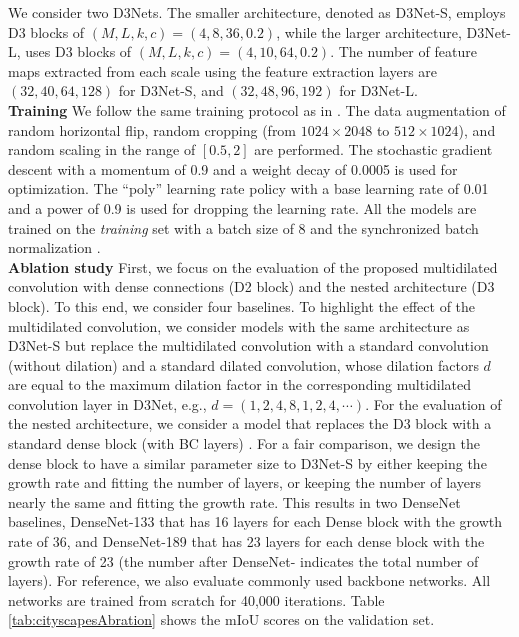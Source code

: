 \documentclass[final]{cvpr}
\begin{document}
We consider two D3Nets. The smaller architecture, denoted as D3Net-S, employs D3 blocks of $(M,L,k,c) = (4,8,36,0.2)$, while the larger architecture, D3Net-L, uses D3 blocks of $(M,L,k,c) = (4,10,64,0.2)$. The number of feature maps extracted from each scale using the feature extraction layers are $(32,40,64,128)$ for D3Net-S, and $(32,48,96,192)$ for D3Net-L. 
\vspace{3mm}\\
\textbf{Training} \hspace{1mm}
We follow the same training protocol as in \cite{zhao2017pspnet,zhao2018psanet}. The data augmentation of random horizontal flip, random cropping (from $1024\times2048$ to $512\times1024$), and random scaling in the range of $[0.5, 2]$ are performed.
The stochastic gradient descent with a momentum of 0.9 and a
weight decay of 0.0005 is used for optimization. 
The ``poly'' learning rate policy with a base learning rate of 0.01 and a power of 0.9 is used for dropping the learning rate. All the models are trained on the \textit{training} set with a batch size of 8 and the synchronized batch normalization \cite{Zhang18SyncBN}.
\vspace{3mm}\\
\textbf{Ablation study} \hspace{1mm}
First, we focus on the evaluation of the proposed multidilated convolution with dense connections (D2 block) and the nested architecture (D3 block). To this end, we consider four baselines. To highlight the effect of the multidilated convolution, we consider models with the same architecture as D3Net-S but replace the multidilated convolution with a standard convolution (without dilation) and a standard dilated convolution, whose dilation factors $d$ are equal to the maximum dilation factor in the corresponding multidilated convolution layer in D3Net, e.g., $d=(1,2,4,8,1,2,4,\cdots)$. For the evaluation of the nested architecture, we consider a model that replaces the D3 block with a standard dense block (with BC layers) \cite{Huang17Densenet}. For a fair comparison, we design the dense block to have a similar parameter size to D3Net-S by either keeping the growth rate and fitting the number of layers, or keeping the number of layers nearly the same and fitting the growth rate. This results in two DenseNet baselines, DenseNet-133 that has 16 layers for each Dense block with the growth rate of 36, and DenseNet-189 that has 23 layers for each dense block with the growth rate of 23 (the number after DenseNet- indicates the total number of layers). For reference, we also evaluate commonly used backbone networks. All networks are trained from scratch for 40,000 iterations. Table \ref{tab:cityscapesAbration} shows the mIoU scores on the validation set.
\end{document}

